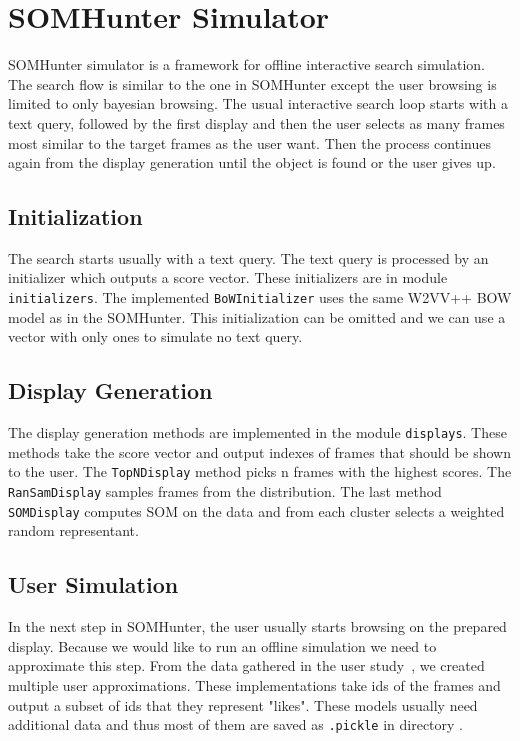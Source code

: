 \chapter{SOMHunter Simulator}
\label{somhunter-simulator}


SOMHunter simulator is a framework for offline interactive search simulation. The search flow is similar to the one in SOMHunter except the user browsing is limited to only bayesian browsing. The usual interactive search loop starts with a text query, followed by the first display and then the user selects as many frames most similar to the target frames as the user want. Then the process continues again from the display generation until the object is found or the user gives up.

\section{Initialization}

The search starts usually with a text query. The text query is processed by an initializer which outputs a score vector. These initializers are in module \lstinline{initializers}. The implemented \lstinline{BoWInitializer} uses the same W2VV++ BOW model as in the SOMHunter. This initialization can be omitted and we can use a vector with only ones to simulate no text query.

\section{Display Generation}

The display generation methods are implemented in the module \lstinline{displays}. These methods take the score vector and output indexes of frames that should be shown to the user. The \lstinline{TopNDisplay} method picks n frames with the highest scores. The \lstinline{RanSamDisplay} samples frames from the distribution. The last method \lstinline{SOMDisplay} computes SOM on the data and from each cluster selects a weighted random representant. 

\section{User Simulation}

In the next step in SOMHunter, the user usually starts browsing on the prepared display. Because we would like to run an offline simulation we need to approximate this step. From the data gathered in the user study~\cite{peska2021}, we created multiple user approximations. These implementations take ids of the frames and output a subset of ids that they represent "likes". These models usually need additional data and thus most of them are saved as \lstinline{.pickle} in directory .

